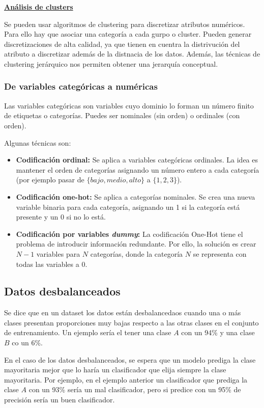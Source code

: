 \documentclass[12pt, letterpaper]{article}
\begin{document}
\vspace{1 em}
\underline{\textbf{Análisis de clusters}}

Se pueden usar algoritmos de clustering para discretizar atributos numéricos. Para ello hay que asociar una categoría a cada gurpo o cluster. Pueden generar discretizaciones de alta calidad, ya que tienen en cuentra la distrivución del atributo a discretizar además de la distnacia de los datos. Además, las técnicas de clustering jerárquico nos permiten obtener una jerarquía conceptual.

\subsubsection{De variables categóricas a numéricas}
Las variables categóricas son variables cuyo dominio lo forman un número finito de etiquetas o categorías. Puedes ser nominales (sin orden) o ordinales (con orden).

Algunas técnicas son:
\begin{itemize}
    \item \textbf{Codificación ordinal:} Se aplica a variables categóricas ordinales. La idea es mantener el orden de categorías asignando un número entero a cada categoría (por ejemplo pasar de $\{bajo, medio, alto\}$ a $\{1,2,3\}$).
    \item \textbf{Codificación one-hot:} Se aplica a categorías nominales. Se crea una nueva variable binaria para cada categoría, asignando un 1 si la categoría está presente y un 0 si no lo está.
    \item \textbf{Codificación por variables \textit{dummy}:} La codificación One-Hot tiene el problema de introducir información redundante. Por ello, la solución es crear $N-1$ variables para $N$ categorías, donde la categoría $N$ se representa con todas las variables a 0.
\end{itemize}


\subsection{Datos desbalanceados}

Se dice que en un dataset los datos están desbalancedaos cuando una o más clases presentan proporciones muy bajas respecto a las otras clases en el conjunto de entrenamiento. Un ejemplo sería el tener una clase $A$ con un 94\% y una clase $B$ co un 6\%.

En el caso de los datos desbalanceados, se espera que un modelo prediga la clase mayoritaria mejor que lo haría un clasificador que elija siempre la clase mayoritaria. Por ejemplo, en el ejemplo anterior un clasificador que prediga la clase $A$ con un 93\% sería un mal clasificador, pero si predice con un 95\% de precisión sería un buen clasificador.
\end{document}
